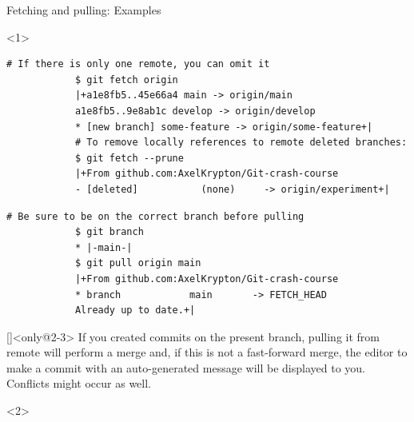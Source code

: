 \documentclass[usenames,svgnames,14pt]{beamer}
\begin{document}
\begin{frame}[fragile]{Fetching and pulling: Examples}
    \begin{onlyenv}<1>
        \vspace{5mm}
        \begin{lstlisting}[style=MyBash]
            # If there is only one remote, you can omit it
            $ git fetch origin
            |+a1e8fb5..45e66a4 main -> origin/main
            a1e8fb5..9e8ab1c develop -> origin/develop
            * [new branch] some-feature -> origin/some-feature+|
            # To remove locally references to remote deleted branches:
            $ git fetch --prune
            |+From github.com:AxelKrypton/Git-crash-course
            - [deleted]           (none)     -> origin/experiment+|
        \end{lstlisting}
        \begin{lstlisting}[style=MyBash]
            # Be sure to be on the correct branch before pulling
            $ git branch
            * |-main-|
            $ git pull origin main
            |+From github.com:AxelKrypton/Git-crash-course
            * branch            main       -> FETCH_HEAD
            Already up to date.+|
        \end{lstlisting}
    \end{onlyenv}
    \begin{overlayarea}{\textwidth}{0.7\textheight}
        \begin{varblock}{}[\textwidth]{}<only@2-3>
            If you created commits on the present branch, pulling it from remote will perform a merge and, if this is not a fast-forward merge, the editor to make a commit with an auto-generated message will be displayed to you. \alert{Conflicts might occur as well.}
        \end{varblock}
        \begin{onlyenv}<2>
            \begin{center}
\end{center}
\end{onlyenv}
\end{overlayarea}
\end{frame}
\end{document}
